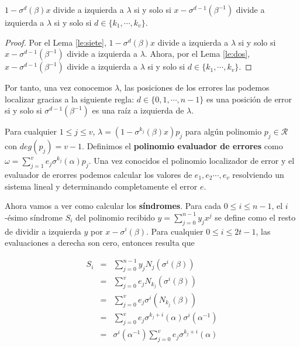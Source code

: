 \begin{proposition}
\label{prop:ocho}
    $1-\sigma^d(\beta)x$ divide a izquierda a $\lambda$ si y solo si $x-\sigma^{d-1}(\beta^{-1})$ divide a izquierda a $\lambda$ si y solo si $d \in \{k_1,\cdots,k_v \}$.
\end{proposition}

\begin{proof}
    Por el Lema \ref{le:siete}, $1-\sigma^d(\beta)x$ divide a izquierda a $\lambda$ si y solo si $x-\sigma^{d-1}(\beta^{-1})$ divide a izquierda a $\lambda$. Ahora, por el Lema \ref{le:dos}, $x-\sigma^{d-1}(\beta^{-1})$ divide a izquierda a $\lambda$ si y solo si $d \in \{k_1,\cdots,k_v \}$.
\end{proof}

Por tanto, una vez conocemos $\lambda$, las posiciones de los errores las podemos localizar gracias a la siguiente regla: $d \in \{0,1,\cdots,n-1 \}$ es una posición de error si y solo si $\sigma^{d-1}(\beta^{-1})$ es una raíz a izquierda de $\lambda$.

Para cualquier $ 1 \leq j \leq v$, $\lambda = (1-\sigma^{k_j}(\beta)x)p_j $ para algún polinomio $p_j \in \mathcal{R}$ con $deg(p_j) = v-1$. Definimos el \textbf{polinomio evaluador de errores} como $\omega = \sum_{j=1}^v e_j\sigma^{k_j}(\alpha)p_j$. Una vez conocidos el polinomio localizador de error y el evaluador de erorres podemos calcular los valores de $e_1,e_2 \cdots, e_v$ resolviendo un sistema lineal y determinando completamente el error $e$.


Ahora vamos a ver como calcular los \textbf{síndromes}. Para cada $0 \leq i \leq n-1$, el $i$-ésimo síndrome $S_i$ del polinomio recibido $y = \sum_{j=0}^{n-1} y_jx^j$ se define como el resto de dividir a izquierda $y$ por $x-\sigma^i(\beta)$. Para cualquier $0 \leq i \leq 2t-1$, las evaluaciones a derecha son cero, entonces resulta que

\begin{eqnarray*}
     S_i & = &  \sum_{j=0}^{n-1} y_jN_j(\sigma^i(\beta)) \\
     & = & \sum_{j=0}^{v} e_jN_{k_j}(\sigma^i(\beta))\\
     & = & \sum_{j=0}^{v} e_j\sigma^i(N_{k_j}(\beta)) \\
      & = & \sum_{j=0}^{v} e_j\sigma^{k_j+i}(\alpha)\sigma^i(\alpha^{-1}) \\
       & = & \sigma^i(\alpha^{-1}) \sum_{j=0}^{v} e_j\sigma^{k_j+i}(\alpha)    
\end{eqnarray*}



